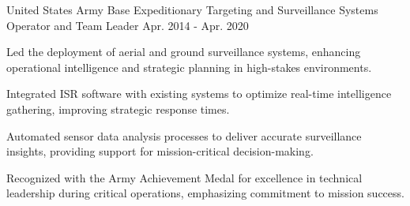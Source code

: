 \begin{cventries}
  \cventry
    {United States Army} %
    {Base Expeditionary Targeting and Surveillance Systems Operator and Team Leader} %
    {} %
    {Apr. 2014 - Apr. 2020} %
    {
      \begin{cvitems} %
      \item {Led the deployment of aerial and ground surveillance systems, enhancing operational intelligence and strategic planning in high-stakes environments.}
    \item {Integrated ISR software with existing systems to optimize real-time intelligence gathering, improving strategic response times.}
    \item {Automated sensor data analysis processes to deliver accurate surveillance insights, providing support for mission-critical decision-making.}
    \item {Recognized with the Army Achievement Medal for excellence in technical leadership during critical operations, emphasizing commitment to mission success.}
      \end{cvitems}
    }
\end{cventries}
